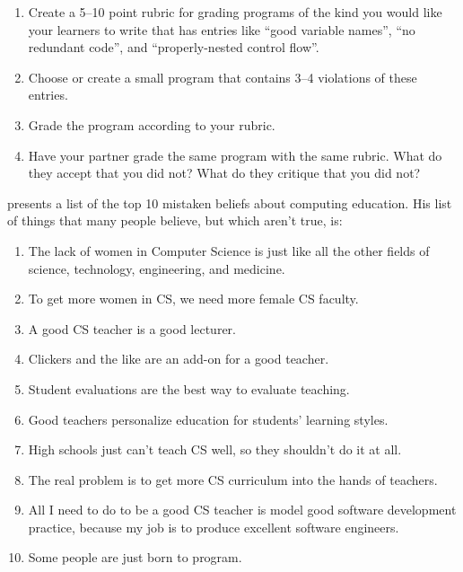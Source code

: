 
\begin{enumerate}

\item
  Create a 5--10 point rubric for grading programs of the kind you
  would like your learners to write that has entries like ``good
  variable names'', ``no redundant code'', and ``properly-nested
  control flow''.

\item
  Choose or create a small program that contains 3--4 violations of
  these entries.

\item
  Grade the program according to your rubric.

\item
  Have your partner grade the same program with the same rubric.  What
  do they accept that you did not?  What do they critique that you did
  not?

\end{enumerate}


\cite{Guzd2015b} presents a list of the top 10 mistaken beliefs about
computing education.  His list of things that many people believe, but
which aren't true, is:

\begin{enumerate}

\item
  The lack of women in Computer Science is just like all the other
  fields of science, technology, engineering, and medicine.

\item
  To get more women in CS, we need more female CS faculty.

\item
  A good CS teacher is a good lecturer.

\item
  Clickers and the like are an add-on for a good teacher.

\item
  Student evaluations are the best way to evaluate teaching.

\item
  Good teachers personalize education for students' learning styles.

\item
  High schools just can't teach CS well, so they shouldn't do it at
  all.

\item
  The real problem is to get more CS curriculum into the hands of
  teachers.

\item
  All I need to do to be a good CS teacher is model good software
  development practice, because my job is to produce excellent
  software engineers.

\item
  Some people are just born to program.

\end{enumerate}

